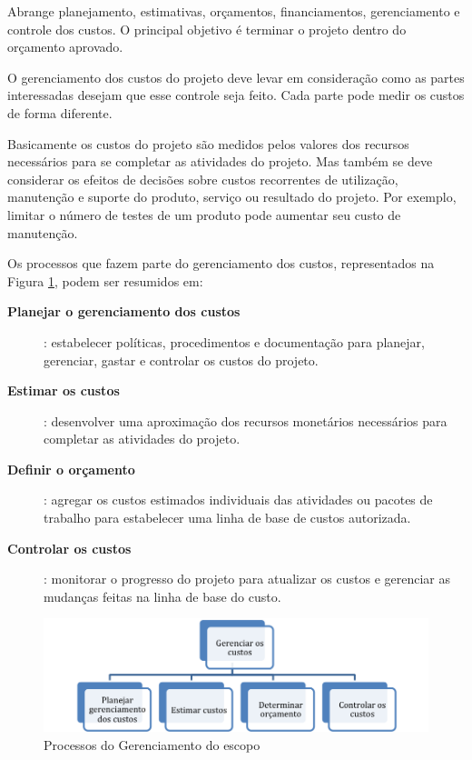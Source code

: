 


Abrange planejamento, estimativas, orçamentos, financiamentos, gerenciamento e controle dos custos. O principal objetivo é terminar o projeto dentro do orçamento aprovado.

O gerenciamento dos custos do projeto deve levar em consideração como as partes interessadas desejam que esse controle seja feito. Cada parte pode medir os custos de forma diferente.

Basicamente os custos do projeto são medidos pelos valores dos recursos necessários para se completar as atividades do projeto. Mas também se deve considerar os efeitos de decisões sobre custos recorrentes de utilização, manutenção e suporte do produto, serviço ou resultado do projeto. Por exemplo, limitar o número de testes de um produto pode aumentar seu custo de manutenção.

Os processos que fazem parte do gerenciamento dos custos, representados na Figura \ref{fig:proc:ger:custos}, podem ser resumidos em:

\begin{description}
	
	\item[\textbf{Planejar o gerenciamento dos custos}]: estabelecer políticas, procedimentos e documentação para planejar, gerenciar, gastar e controlar os custos do projeto.
	
	\item[\textbf{Estimar os custos}]: desenvolver uma aproximação dos recursos monetários necessários para completar as atividades do projeto.

	\item[\textbf{Definir o orçamento}]: agregar os custos estimados individuais das atividades ou pacotes de trabalho para estabelecer uma linha de base de custos autorizada.
	
	\item[\textbf{Controlar os custos}]: monitorar o progresso do projeto para atualizar os custos e gerenciar as mudanças feitas na linha de base do custo.	

\end{description}

\begin{figure}[!h]
	\centering
	\includegraphics[scale=0.75]{Figuras/gerenciamento_custos.png}
	\caption{Processos do Gerenciamento do escopo}
	\label{fig:proc:ger:custos}
\end{figure}

